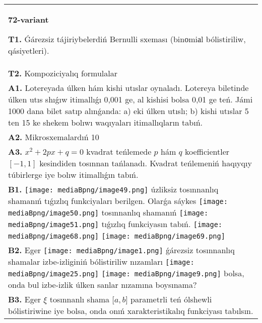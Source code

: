 \documentclass{article}
\begin{document}
\begin{tabular}{m{17cm}}
\textbf{72-variant}
\newline

\textbf{T1.} Ǵárezsiz tájiriybelerdiń Bernulli sxeması (binоmiаl bólistiriliw, qásiyetleri).
 \\
\textbf{T2.} Kompoziciyalıq formulalar \\
\textbf{A1.} Lotereyada úlken hám kishi utıslar oynaladı. Lotereya biletinde úlken utıs shıǵıw itimallıǵı 0,001 ge, al kishisi bolsa 0,01 ge teń. Jámi 1000 dana bilet satıp alınǵanda: a) eki úlken utıslı; b) kishi utıslar 5 ten 15 ke shekem bolıwı waqıyaları itimallıqların tabıń.
 \\
\textbf{A2.} Mikrosxemalardıń 10%
 \\
\textbf{A3.} ${{x}^{2}}+2px+q=0$ kvadrat teńlemede $p$ hám $q$ koefficientler $\left[ -1,1 \right]$ kesindiden tosınnan tańlanadı. Kvadrat teńlemeniń haqıyqıy túbirlerge iye bolıw itimallıǵın tabıń.
 \\
\textbf{B1.} \texttt{[image: mediaBpng/image49.png]} úzliksiz tosınnanlıq shamanıń tıǵızlıq funkciyaları berilgen. Olarǵa sáykes \texttt{[image: mediaBpng/image50.png]} tosınnanlıq shamanıń \texttt{[image: mediaBpng/image51.png]} tıǵızlıq funkciyasın tabıń. \texttt{[image: mediaBpng/image68.png]} \texttt{[image: mediaBpng/image69.png]}
 \\
\textbf{B2.} Eger \texttt{[image: mediaBpng/image1.png]} ǵárezsiz tosınnanlıq shamalar izbe-izliginiń bólistiriliw nızamları
\texttt{[image: mediaBpng/image25.png]} \texttt{[image: mediaBpng/image9.png]}
bolsa, onda bul izbe-izlik úlken sanlar nızamına boysınama?
 \\
\textbf{B3.} Eger \(\xi\) tosınnanlı shama \(\lbrack a,b\rbrack\) parametrli teń ólshewli bólistiriwine iye bolsa, onda onıń xarakteristikalıq funkciyası tabılsın.

\end{tabular}
\end{document}
